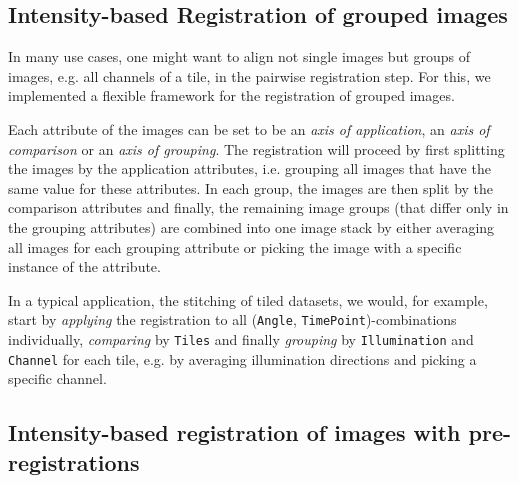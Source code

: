 \subsection*{Intensity-based Registration of grouped images}

In many use cases, one might want to align not single images but groups of images, e.g. all channels of a tile, in the pairwise registration step. For this, we implemented a flexible framework for the registration of grouped images.

Each attribute of the images can be set to be an \emph{axis of application}, an \emph{axis of comparison} or an \emph{axis of grouping}. The registration will proceed by first splitting the images by the application attributes, i.e. grouping all images that have the same value for these attributes. In each group, the images are then split by the comparison attributes and finally, the remaining image groups (that differ only in the grouping attributes) are combined into one image stack by either averaging all images for each grouping attribute or picking the image with a specific instance of the attribute.   

In a typical application, the stitching of tiled datasets, we would, for example, start by \emph{applying} the registration to all (\texttt{Angle}, \texttt{TimePoint})-combinations individually, \emph{comparing} by \texttt{Tiles} and finally \emph{grouping} by \texttt{Illumination} and \texttt{Channel} for each tile, e.g. by averaging illumination directions and picking a specific channel.

\subsection*{Intensity-based registration of images with pre-registrations}

